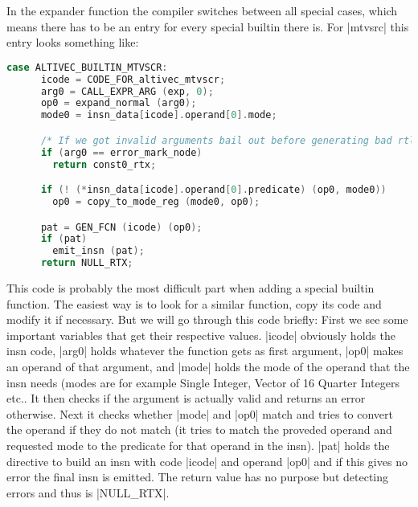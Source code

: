In the expander function the compiler switches between all special cases, which means there has to be an entry for every special builtin there is. For |mtvsrc| this entry looks something like:
\begin{lstlisting}[language=C++,basicstyle=\ttfamily\scriptsize,keywordstyle=\color{red}]
case ALTIVEC_BUILTIN_MTVSCR:
      icode = CODE_FOR_altivec_mtvscr;
      arg0 = CALL_EXPR_ARG (exp, 0);
      op0 = expand_normal (arg0);
      mode0 = insn_data[icode].operand[0].mode;

      /* If we got invalid arguments bail out before generating bad rtl.  */
      if (arg0 == error_mark_node)
    	return const0_rtx;

      if (! (*insn_data[icode].operand[0].predicate) (op0, mode0))
     	op0 = copy_to_mode_reg (mode0, op0);

      pat = GEN_FCN (icode) (op0);
      if (pat)
    	emit_insn (pat);
      return NULL_RTX;
\end{lstlisting}
This code is probably the most difficult part when adding a special builtin function. The easiest way is to look for a similar function, copy its code and modify it if necessary. But we will go through this code briefly:
First we see some important variables that get their respective values. |icode| obviously holds the insn code, |arg0| holds whatever the function gets as first argument, |op0| makes an operand of that argument, and |mode| holds the mode of the operand that the insn needs (modes are for example Single Integer, Vector of 16 Quarter Integers etc.. It then checks if the argument is actually valid and returns an error otherwise. Next it checks whether |mode| and |op0| match and tries to convert the operand if they do not match (it tries to match the proveded operand and requested mode to the predicate for that operand in the insn). |pat| holds the directive to build an insn with code |icode| and operand |op0| and if this gives no error the final insn is emitted. The return value has no purpose but detecting errors and thus is |NULL_RTX|.

